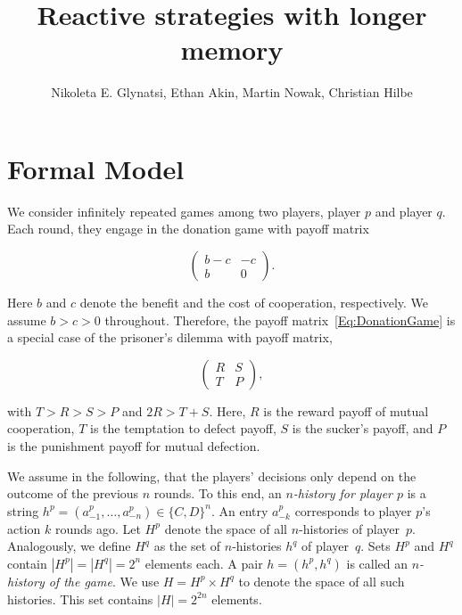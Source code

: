 \documentclass{article}
\title{Reactive strategies with longer memory}
\author{Nikoleta E. Glynatsi, Ethan Akin, Martin Nowak, Christian Hilbe}
\date{}
\theoremstyle{definition}
\begin{document}
\maketitle

\section{Formal Model}

We consider infinitely repeated games among two players, player $p$ and
player $q$. Each round, they engage in the donation game with payoff matrix

\begin{equation} \label{Eq:DonationGame}
\left(
\begin{array}{cc}
b-c	&-c\\
b	&0
\end{array}
\right).
\end{equation}

Here $b$ and $c$ denote the benefit and the cost of cooperation, respectively. 
We assume $b\!>\!c\!>\!0$ throughout.
Therefore, the payoff matrix~\eqref{Eq:DonationGame} is a special case of the
prisoner's dilemma with payoff matrix,

\begin{equation} \label{Eq:PrisonerDilemma}
    \left(
    \begin{array}{cc}
    R & S\\
    T & P
    \end{array}
    \right),
\end{equation}

with $T > R > S > P$ and $2 R > T + S$. Here, $R$ is the reward payoff of mutual
cooperation, $T$ is the temptation to defect payoff, $S$ is the sucker's payoff,
and $P$ is the punishment payoff for mutual defection.

We assume in the following, that the players' decisions only depend on the
outcome of the previous $n$ rounds. To this end, an {\it $n$-history for player
$p$} is a string $h^p=(a^p_{-1},\ldots,a^p_{-n})\!\in\!\{C,D\}^n$. An entry
$a^p_{-k}$ corresponds to player $p$'s action $k$ rounds ago. Let $H^p$ denote
the space of all $n$-histories of player~$p$. Analogously, we define $H^q$ as
the set of $n$-histories $h^q$ of player~$q$. Sets $H^p$ and $H^q$ contain
$|H^p|=|H^q|=2^{n}$ elements each. A pair $h\!=\!(h^p,h^q)$ is called
an {\it $n$-history of the game}. We use $H=H^p\times H^q$ to denote the space
of all such histories. This set contains $|H|=2^{2n}$ elements.
\end{document}
